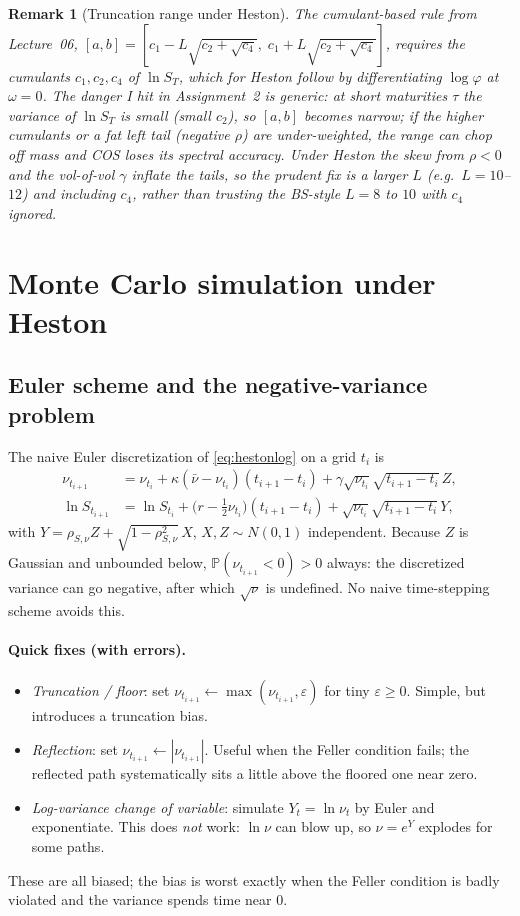 \documentclass[11pt]{article}
\newcommand{\ch}{\varphi}
\newtheorem{remark}{Remark}
\begin{document}
\begin{remark}[Truncation range under Heston]
The cumulant-based rule from Lecture~06,
$[a,b]=[c_1 - L\sqrt{c_2+\sqrt{c_4}},\; c_1 + L\sqrt{c_2+\sqrt{c_4}}]$, requires the
cumulants $c_1,c_2,c_4$ of $\ln S_T$, which for Heston follow by differentiating
$\log\ch$ at $\omega=0$. The danger I hit in Assignment~2 is generic: at \emph{short}
maturities $\tau$ the variance of $\ln S_T$ is small (small $c_2$), so $[a,b]$ becomes
narrow; if the higher cumulants or a fat left tail (negative $\rho$) are under-weighted,
the range can chop off mass and COS loses its spectral accuracy. Under Heston the skew
from $\rho<0$ and the vol-of-vol $\gamma$ inflate the tails, so the prudent fix is a
larger $L$ (e.g.\ $L=10$--$12$) and including $c_4$, rather than trusting the BS-style
$L=8$ to $10$ with $c_4$ ignored.
\end{remark}

\section{Monte Carlo simulation under Heston}

\subsection{Euler scheme and the negative-variance problem}

The naive Euler discretization of \eqref{eq:hestonlog} on a grid $t_i$ is
\begin{align}
\nu_{t_{i+1}} &= \nu_{t_i} + \kappa(\bar\nu-\nu_{t_i})(t_{i+1}-t_i)
+ \gamma\sqrt{\nu_{t_i}}\sqrt{t_{i+1}-t_i}\,Z,\\
\ln S_{t_{i+1}} &= \ln S_{t_i} + \Big(r-\tfrac12\nu_{t_i}\Big)(t_{i+1}-t_i)
+ \sqrt{\nu_{t_i}}\sqrt{t_{i+1}-t_i}\,Y,
\end{align}
with $Y=\rho_{S,\nu}Z + \sqrt{1-\rho_{S,\nu}^2}\,X$, $X,Z\sim N(0,1)$ independent.
Because $Z$ is Gaussian and unbounded below, $\mathbb P(\nu_{t_{i+1}}<0)>0$ always: the
discretized variance can go negative, after which $\sqrt{\nu}$ is undefined. No naive
time-stepping scheme avoids this.

\paragraph{Quick fixes (with errors).}
\begin{itemize}[noitemsep]
\item \emph{Truncation / floor}: set $\nu_{t_{i+1}}\leftarrow\max(\nu_{t_{i+1}},\varepsilon)$
for tiny $\varepsilon\ge0$. Simple, but introduces a truncation bias.
\item \emph{Reflection}: set $\nu_{t_{i+1}}\leftarrow|\nu_{t_{i+1}}|$. Useful when the
Feller condition fails; the reflected path systematically sits a little above the floored
one near zero.
\item \emph{Log-variance change of variable}: simulate $Y_t=\ln\nu_t$ by Euler and
exponentiate. This does \emph{not} work: $\ln\nu$ can blow up, so $\nu=e^{Y}$ explodes for
some paths.
\end{itemize}
These are all biased; the bias is worst exactly when the Feller condition is badly
violated and the variance spends time near $0$.
\end{document}
